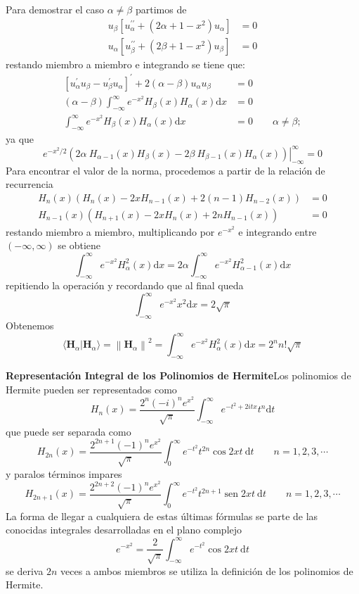 \documentclass[spanish,notitlepage,letterpaper,12pt]{article}
\begin{document}
Para demostrar el caso $\alpha\neq\beta$ partimos de
\begin{align*}
u_{\beta}\left[  u_{\alpha}^{\prime\prime}+\left(  2\alpha+1-x^{2}\right)
u_{\alpha}\right]   & =0\\
u_{\alpha}\left[  u_{\beta}^{\prime\prime}+\left(  2\beta+1-x^{2}\right)
u_{\beta}\right]   & =0
\end{align*}
restando miembro a miembro e integrando se tiene que:
\begin{align*}
\left[  u_{\alpha}^{\prime}u_{\beta}-u_{\beta}^{\prime}u_{\alpha}\right]
^{\prime}+2\left(  \alpha-\beta\right)  u_{\alpha}u_{\beta} & =0\\
\left(  \alpha-\beta\right)  \int_{-\infty}^{\infty}e^{-x^{2}}H_{\beta
}(x)H_{\alpha}(x)\mathrm{d}x  & =0\\
\int_{-\infty}^{\infty}e^{-x^{2}}H_{\beta}(x)H_{\alpha}(x)\mathrm{d}x  &
=0\qquad\alpha\neq\beta;
\end{align*}
ya que
\[
\left.  e^{-x^{2}/2}\left(  2\alpha\ H_{\alpha-1}(x)H_{\beta}(x)-2\beta
\ H_{\beta-1}(x)H_{\alpha}(x)\right)  \right|  _{-\infty}^{\infty}=0
\]
Para encontrar el valor de la norma, procedemos a partir de la relaci\'{o}n de
recurrencia
\begin{align*}
H_{n}(x)\left(  H_{n}(x)-2xH_{n-1}(x)+2(n-1)H_{n-2}(x)\right)   & =0\\
H_{n-1}(x)\left(  H_{n+1}(x)-2xH_{n}(x)+2nH_{n-1}(x)\right)   & =0
\end{align*}
restando miembro a miembro, multiplicando por $e^{-x^{2}}$ e integrando entre
$(-\infty,\infty)$ se obtiene
\[
\int_{-\infty}^{\infty}e^{-x^{2}}H_{\alpha}^{2}(x)\mathrm{d}x=2\alpha
\int_{-\infty}^{\infty}e^{-x^{2}}H_{\alpha-1}^{2}(x)\mathrm{d}x
\]
repitiendo la operaci\'{o}n y recordando que al final queda
\[
\int_{-\infty}^{\infty}e^{-x^{2}}x^{2}\mathrm{d}x=2\sqrt{\pi}
\]
Obtenemos
\[
\langle\mathbf{H}_{\alpha}|\mathbf{H}_{\alpha}\rangle=\left\|  \mathbf{H}%
_{\alpha}\right\|  ^{2}=\int_{-\infty}^{\infty}e^{-x^{2}}H_{\alpha}%
^{2}(x)\mathrm{d}x=2^{n}n!\sqrt{\pi}
\]

\textbf{Representaci\'{o}n Integral de los Polinomios de Hermite}\newline Los
polinomios de Hermite pueden ser representados como
\[
H_{n}(x)=\frac{2^{n}(-i)^{n}e^{x^{2}}}{\sqrt{\pi}}\int_{-\infty}^{\infty
}e^{-t^{2}+2itx}t^{n}\mathrm{d}t
\]
que puede ser separada como
\[
H_{2n}(x)=\frac{2^{2n+1}(-1)^{n}e^{x^{2}}}{\sqrt{\pi}}\int_{0}^{\infty
}e^{-t^{2}}t^{2n}\cos2xt\ \mathrm{d}t\qquad n=1,2,3,\cdots
\]
y paralos t\'{e}rminos impares
\[
H_{2n+1}(x)=\frac{2^{2n+2}(-1)^{n}e^{x^{2}}}{\sqrt{\pi}}\int_{0}^{\infty
}e^{-t^{2}}t^{2n+1}\operatorname*{sen}2xt\ \mathrm{d}t\qquad n=1,2,3,\cdots
\]
La forma de llegar a cualquiera de estas \'{u}ltimas f\'{o}rmulas se parte de
las conocidas integrales desarrolladas en el plano complejo
\[
e^{-x^{2}}=\frac2{\sqrt{\pi}}\int_{-\infty}^{\infty}e^{-t^{2}}\cos
2xt\ \mathrm{d}t
\]
se deriva $2n$ veces a ambos miembros se utiliza la definici\'{o}n de los
polinomios de Hermite.
\end{document}
